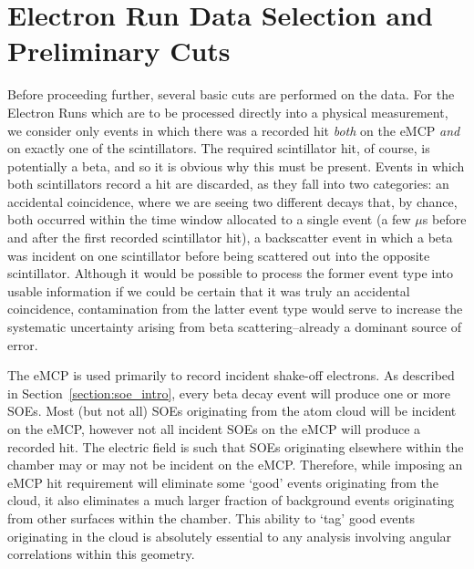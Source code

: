 






{
	\pagebreak
}
{}

\section{Electron Run Data Selection and Preliminary Cuts}
\label{sec:preliminary_cuts}

Before proceeding further, several basic cuts are performed on the data.  For the Electron Runs which are to be processed directly into a physical measurement, we consider only events in which there was a recorded hit \emph{both} on the eMCP \emph{and} on exactly one of the scintillators.  The required scintillator hit, of course, is potentially a beta, and so it is obvious why this must be present.  Events in which both scintillators record a hit are discarded, as they fall into two categories:  an accidental coincidence, where we are seeing two different decays that, by chance, both occurred within the time window allocated to a single event (a few $\mu$s before and after the first recorded scintillator hit), a backscatter event in which a beta was incident on one scintillator before being scattered out into the opposite scintillator.  Although it would be possible to process the former event type into usable information if we could be certain that it was truly an accidental coincidence, contamination from the latter event type would serve to increase the systematic uncertainty arising from beta scattering--already a dominant source of error.


The eMCP is used primarily to record incident shake-off electrons.  As described in Section~\ref{section:soe_intro}, every beta decay event will produce one or more SOEs.  Most (but not all) SOEs originating from the atom cloud will be incident on the eMCP, 
however not all incident SOEs on the eMCP will produce a recorded hit.  The electric field is such that SOEs originating elsewhere within the chamber may or may not be incident on the eMCP.  Therefore, while imposing an eMCP hit requirement will eliminate some `good' events originating from the cloud, it also eliminates a much larger fraction of background events originating from other surfaces within the chamber.  This ability to `tag' good events originating in the cloud is absolutely essential to any analysis involving angular correlations within this geometry.


